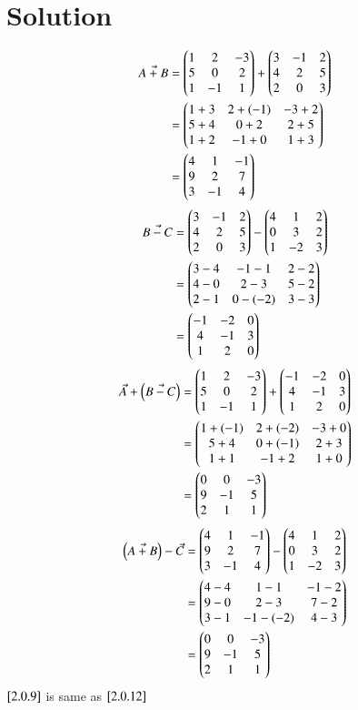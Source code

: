 \documentclass[journal,12pt,twocolumn]{IEEEtran}
\begin{document}
\section{Solution}
\begin{align}
   \Vec{A+B}&=\begin{pmatrix}1&2&-3\\5&0&2\\1&-1&1\end{pmatrix}+\begin{pmatrix}3&-1&2\\4&2&5\\2&0&3\end{pmatrix}\\
   &=\begin{pmatrix}1+3&2+(-1)&-3+2\\5+4&0+2&2+5\\1+2&-1+0&1+3\end{pmatrix}\\
   &=\begin{pmatrix}4&1&-1\\9&2&7\\3&-1&4\end{pmatrix}
\end{align}
\begin{align}
    \Vec{B-C}&=\begin{pmatrix}3&-1&2\\4&2&5\\2&0&3\end{pmatrix}-\begin{pmatrix}4&1&2\\0&3&2\\1&-2&3\end{pmatrix}\\
    &=\begin{pmatrix}3-4&-1-1&2-2\\4-0&2-3&5-2\\2-1&0-(-2)&3-3\end{pmatrix}\\
    &=\begin{pmatrix}-1&-2&0\\4&-1&3\\1&2&0\end{pmatrix}
\end{align}
\begin{align}
    \Vec{A}+\left(\Vec{B-C}\right)&=\begin{pmatrix}1&2&-3\\5&0&2\\1&-1&1\end{pmatrix}+\begin{pmatrix}-1&-2&0\\4&-1&3\\1&2&0\end{pmatrix}\\
    &=\begin{pmatrix}1+(-1)&2+(-2)&-3+0\\5+4&0+(-1)&2+3\\1+1&-1+2&1+0\end{pmatrix}\\
    &=\begin{pmatrix}0&0&-3\\9&-1&5\\2&1&1\end{pmatrix}\label{2.0.9}
\end{align}
\begin{align}
    \left(\Vec{A+B}\right)-\Vec{C}&=\begin{pmatrix}4&1&-1\\9&2&7\\3&-1&4\end{pmatrix}-\begin{pmatrix}4&1&2\\0&3&2\\1&-2&3\end{pmatrix}\\
    &=\begin{pmatrix}4-4&1-1&-1-2\\9-0&2-3&7-2\\3-1&-1-(-2)&4-3\end{pmatrix}\\
    &=\begin{pmatrix}0&0&-3\\9&-1&5\\2&1&1\end{pmatrix}\label{2.0.12}
\end{align}
$\eqref{2.0.9}$ is same as $\eqref{2.0.12}$
\end{document}
